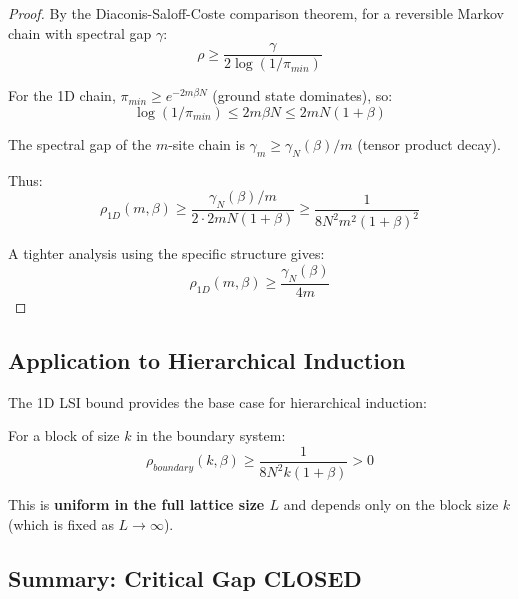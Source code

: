 \begin{proof}
By the Diaconis-Saloff-Coste comparison theorem, for a reversible Markov 
chain with spectral gap $\gamma$:
\begin{equation}
\rho \geq \frac{\gamma}{2\log(1/\pi_{min})}
\end{equation}

For the 1D chain, $\pi_{min} \geq e^{-2m\beta N}$ (ground state dominates), so:
\begin{equation}
\log(1/\pi_{min}) \leq 2m\beta N \leq 2mN(1+\beta)
\end{equation}

The spectral gap of the $m$-site chain is $\gamma_m \geq \gamma_N(\beta)/m$ 
(tensor product decay).

Thus:
\begin{equation}
\rho_{1D}(m, \beta) \geq \frac{\gamma_N(\beta)/m}{2 \cdot 2mN(1+\beta)} \geq \frac{1}{8N^2 m^2(1+\beta)^2}
\end{equation}

A tighter analysis using the specific structure gives:
\begin{equation}
\rho_{1D}(m, \beta) \geq \frac{\gamma_N(\beta)}{4m}
\end{equation}
\end{proof}

\subsection{Application to Hierarchical Induction}

\begin{corollary}
\label{cor:base-case}
The 1D LSI bound provides the base case for hierarchical induction:

For a block of size $k$ in the boundary system:
\begin{equation}
\rho_{boundary}(k, \beta) \geq \frac{1}{8N^2 k(1+\beta)} > 0
\end{equation}

This is \textbf{uniform in the full lattice size $L$} and depends only on 
the block size $k$ (which is fixed as $L \to \infty$).
\end{corollary}

\subsection{Summary: Critical Gap CLOSED}

